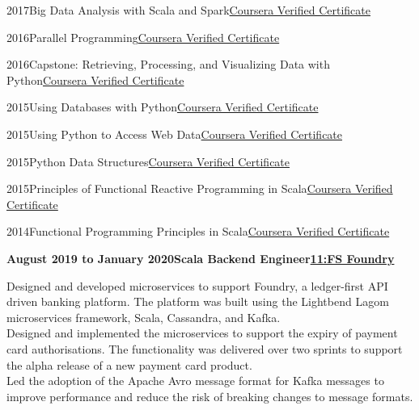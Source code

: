 \documentclass[a4paper,12pt]{article}
\newcommand{\head}[1]{\needspace{6em}\begin{center}{\large{\textbf{\sc{#1}}}}\nopagebreak\end{center}}
\newcommand{\clientwork}[3]{\textbf{#1\hfill#3\hfill#2}\nopagebreak}
\newcommand{\tab}{\hspace{2em}}
\newcommand{\education}[3]{#1\tab#2\hfill#3}
\begin{document}
\education{2017}{Big Data Analysis with Scala and Spark}{\href{https://www.coursera.org/account/accomplishments/verify/BT95Z35S6LVX}{Coursera Verified Certificate}}

\education{2016}{Parallel Programming}{\href{https://www.coursera.org/account/accomplishments/verify/CJ4JSLUQK73D}{Coursera Verified Certificate}}

\education{2016}{Capstone: Retrieving, Processing, and Visualizing Data with Python}{\href{https://www.coursera.org/account/accomplishments/verify/8MKC3G5RN9S3}{Coursera Verified Certificate}}

\education{2015}{Using Databases with Python}{\href{https://www.coursera.org/account/accomplishments/verify/JNESYEJ5FURJ}{Coursera Verified Certificate}}

\education{2015}{Using Python to Access Web Data}{\href{https://www.coursera.org/account/accomplishments/verify/BVY6EDX4Z2PM}{Coursera Verified Certificate}}

\education{2015}{Python Data Structures}{\href{https://www.coursera.org/account/accomplishments/verify/VHVY2836QWWS}{Coursera Verified Certificate}}

\education{2015}{Principles of Functional Reactive Programming in Scala}{\href{https://www.coursera.org/account/accomplishments/records/8jPph3vAjsWdaQeW}{Coursera Verified Certificate}}

\education{2014}{Functional Programming Principles in Scala}{\href{https://www.coursera.org/maestro/api/certificate/get_certificate?verify-code=87DZAXY7SA}{Coursera Verified Certificate}}

\head{Career History}

\clientwork{August 2019 to January 2020}{\href{https://11fs.com/}{11:FS Foundry}}{Scala Backend Engineer}


Designed and developed microservices to support Foundry, a ledger-first API driven banking platform.
The platform was built using the Lightbend Lagom microservices framework, Scala, Cassandra, and
Kafka.\\

Designed and implemented the microservices to support the expiry of payment card authorisations. The
functionality was delivered over two sprints to support the alpha release of a new payment card
product. \\

Led the adoption of the Apache Avro message format for Kafka messages to improve performance and
reduce the risk of breaking changes to message formats.\\
\end{document}
